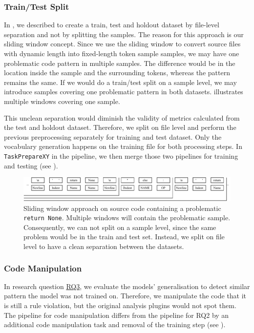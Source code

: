 \subsubsection{Train/Test Split}\label{sec:train_test_split}
In , we described to create a train, test and holdout dataset by file-level separation and not by splitting the samples. The reason for this approach is our sliding window concept. Since we use the sliding window to convert source files with dynamic length into fixed-length token sample samples, we may have one problematic code pattern in multiple samples. The difference would be in the location inside the sample and the surrounding tokens, whereas the pattern remains the same.
If we would do a train/test split on a sample level, we may introduce samples covering one problematic pattern in both datasets.  illustrates multiple windows covering one sample. 

This unclean separation would diminish the validity of metrics calculated from the test and holdout dataset. Therefore, we split on file level and perform the previous preprocessing separately for training and test dataset. Only the vocabulary generation happens on the training file for both processing steps. In \texttt{TaskPrepareXY} in the pipeline, we then merge those two pipelines for training and testing (see ).
\begin{figure}
    \includegraphics[width=1\textwidth]{img/ML/encoding_sliding_window_problem.pdf}
    \caption[Sliding window approach on source code containing a problematic \texttt{return None}]{Sliding window approach on source code containing a problematic \texttt{return None}. Multiple windows will contain the problematic sample. Consequently, we can not split on a sample level, since the same problem would be in the train and test set. Instead, we split on file level to have a clean separation between the datasets.}
    \label{fig:encoding_sliding_window}
\end{figure}

\subsubsection{Code Manipulation}\label{sec:approach_code_manipulation}
In research question \hyperref[rq:3]{RQ3}, we evaluate the models' generalisation to detect similar pattern the model was not trained on. Therefore, we manipulate the code that it is still a rule violation, but the original analysis plugins would not spot them. The pipeline for code manipulation differs from the pipeline for RQ2 by an additional code manipulation task and removal of the training step (see ).

